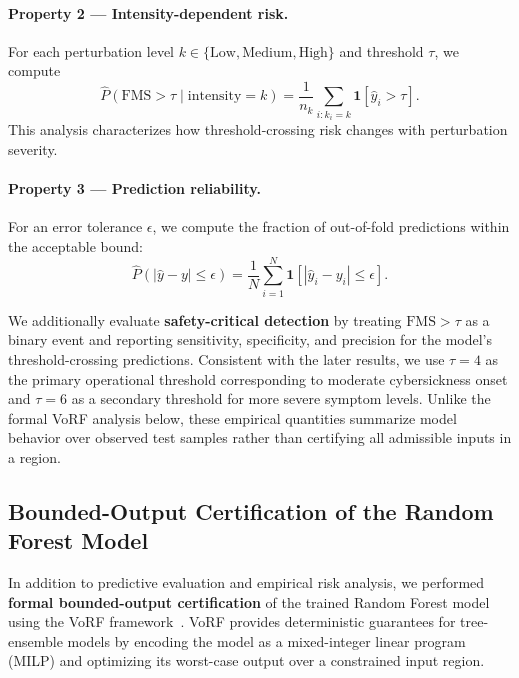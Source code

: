 \documentclass[review]{vgtc}              %
\begin{document}
\paragraph{Property 2 --- Intensity-dependent risk.}
For each perturbation level $k \in \{\mathrm{Low}, \mathrm{Medium}, \mathrm{High}\}$ and threshold $\tau$, we compute
\begin{equation}
\hat{P}(\mathrm{FMS} > \tau \mid \mathrm{intensity}=k)
= \frac{1}{n_k}\sum_{i:k_i=k}\mathbf{1}\!\left[\hat{y}_i > \tau\right].
\end{equation}
This analysis characterizes how threshold-crossing risk changes with perturbation severity.

\paragraph{Property 3 --- Prediction reliability.}
For an error tolerance $\epsilon$, we compute the fraction of out-of-fold predictions within the acceptable bound:
\begin{equation}
\hat{P}(|\hat{y}-y| \le \epsilon)
= \frac{1}{N}\sum_{i=1}^{N}\mathbf{1}\!\left[|\hat{y}_i-y_i| \le \epsilon\right].
\end{equation}

We additionally evaluate \textbf{safety-critical detection} by treating $\mathrm{FMS} > \tau$ as a binary event and reporting sensitivity, specificity, and precision for the model's threshold-crossing predictions. Consistent with the later results, we use $\tau = 4$ as the primary operational threshold corresponding to moderate cybersickness onset and $\tau = 6$ as a secondary threshold for more severe symptom levels. Unlike the formal VoRF analysis below, these empirical quantities summarize model behavior over observed test samples rather than certifying all admissible inputs in a region.

\subsection{Bounded-Output Certification of the Random Forest Model}
\label{sec:vorf}

In addition to predictive evaluation and empirical risk analysis, we performed \textbf{formal bounded-output certification} of the trained Random Forest model using the VoRF framework~\cite{Tornblom2018FormalRF}. VoRF provides deterministic guarantees for tree-ensemble models by encoding the model as a mixed-integer linear program (MILP) and optimizing its worst-case output over a constrained input region.
\end{document}
